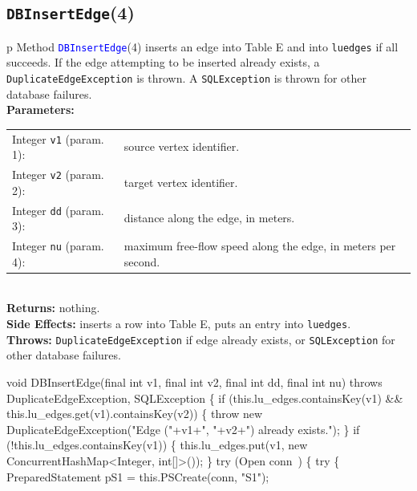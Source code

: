 \subsection{\texttt{DBInsertEdge}(4)}
\begin{tabular}{p{\textwidth}}
\toprule
{}
Method \textcolor{blue}{{\tt{}\protect{}DBInsertEdge}}(4) inserts an edge into Table E
and into {\tt{}lu{}edges} if all succeeds. If the edge attempting to be inserted
already exists, a {\tt{}DuplicateEdgeException} is thrown. A {\tt{}SQLException}
is thrown for other database failures.\\
\midrule
\textbf{Parameters:} \\
\begin{tabular}{lp{116mm}}
Integer {\tt{}v1} (param. 1):&source vertex identifier.\\
Integer {\tt{}v2} (param. 2):&target vertex identifier.\\
Integer {\tt{}dd} (param. 3):&distance along the edge, in meters.\\
Integer {\tt{}nu} (param. 4):&maximum free-flow speed along the edge, in meters per second.\\
\end{tabular}\\
\textbf{Returns:} nothing.\\
\textbf{Side Effects:} inserts a row into Table E, puts an entry into
{\tt{}lu{}edges}.\\
\textbf{Throws:} {\tt{}DuplicateEdgeException} if edge already exists, or
{\tt{}SQLException} for other database failures.\\
\bottomrule
\end{tabular}
\nwenddocs{}\endmoddef{}
void DBInsertEdge(final int v1, final int v2, final int dd, final int nu)
throws DuplicateEdgeException, SQLException \{
  if (this.lu_edges.containsKey(v1) && this.lu_edges.get(v1).containsKey(v2)) \{
    throw new DuplicateEdgeException("Edge ("+v1+", "+v2+") already exists.");
  \}
  if (!this.lu_edges.containsKey(v1)) \{
    this.lu_edges.put(v1, new ConcurrentHashMap<Integer, int[]>());
  \}
  try (\LA{}Open \code{}conn\edoc{}~{\nwtagstyle{}}\RA{}) \{
    try \{
      PreparedStatement pS1 = this.PSCreate(conn, "S1");
